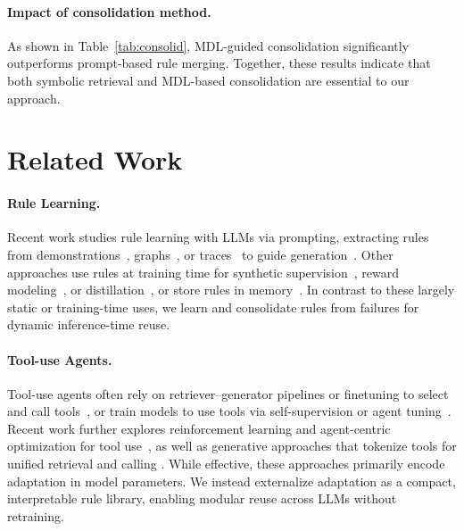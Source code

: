 \documentclass[11pt]{article}
\begin{document}
\paragraph{Impact of consolidation method.}

As shown in Table~\ref{tab:consolid}, MDL-guided consolidation significantly outperforms
prompt-based rule merging. Together, these results indicate that both symbolic retrieval
and MDL-based consolidation are essential to our approach.









\section{Related Work}

\paragraph{Rule Learning.}
Recent work studies rule learning with LLMs via prompting, extracting rules from
demonstrations~\cite{gao2024customizing}, graphs~\cite{chen2024rulerag}, or traces~\cite{zhang2024ruag}
to guide generation~\cite{zhou2024self,wang2024ulogic}. Other approaches use rules at training
time for synthetic supervision~\cite{morishita2024enhancing}, reward modeling~\cite{wang2025autorule},
or distillation~\cite{sadeq2025improving}, or store rules in memory~\cite{wang2024symbolic}. In
contrast to these largely static or training-time uses, we learn and consolidate rules from
failures for dynamic inference-time reuse.


\paragraph{Tool-use Agents.}
Tool-use agents often rely on retriever--generator pipelines or finetuning to select and call
tools~\citep{qin2023toolllm,patil2023gorilla}, or train models to use tools via self-supervision
or agent tuning~\citep{schick2023toolformer}. Recent work further explores reinforcement
learning and agent-centric optimization for tool use~\citep{le2025toolbrain,zhang2025toolr1},
as well as generative approaches that tokenize tools for unified retrieval and calling
\citep{hao2023toolkengpt,wang2024toolgen}. While effective, these approaches primarily encode
adaptation in model parameters. We instead externalize adaptation as a compact, interpretable
rule library, enabling modular reuse across LLMs without retraining.
\end{document}
